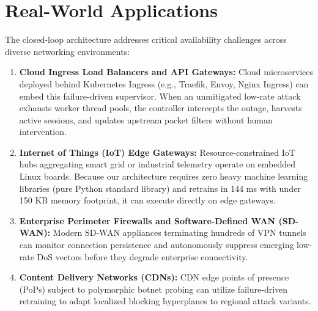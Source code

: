 \documentclass[12pt,a4paper,oneside]{report}
\begin{document}
\section{Real-World Applications}
The closed-loop architecture addresses critical availability challenges across diverse networking environments:
\begin{enumerate}
    \item \textbf{Cloud Ingress Load Balancers and API Gateways:} Cloud microservices deployed behind Kubernetes Ingress (e.g., Traefik, Envoy, Nginx Ingress) can embed this failure-driven supervisor. When an unmitigated low-rate attack exhausts worker thread pools, the controller intercepts the outage, harvests active sessions, and updates upstream packet filters without human intervention.
    \item \textbf{Internet of Things (IoT) Edge Gateways:} Resource-constrained IoT hubs aggregating smart grid or industrial telemetry operate on embedded Linux boards. Because our architecture requires zero heavy machine learning libraries (pure Python standard library) and retrains in 144 ms with under 150 KB memory footprint, it can execute directly on edge gateways.
    \item \textbf{Enterprise Perimeter Firewalls and Software-Defined WAN (SD-WAN):} Modern SD-WAN appliances terminating hundreds of VPN tunnels can monitor connection persistence and autonomously suppress emerging low-rate DoS vectors before they degrade enterprise connectivity.
    \item \textbf{Content Delivery Networks (CDNs):} CDN edge points of presence (PoPs) subject to polymorphic botnet probing can utilize failure-driven retraining to adapt localized blocking hyperplanes to regional attack variants.
\end{enumerate}
\end{document}
